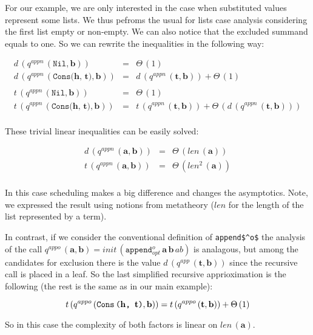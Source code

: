 For our example, we are only interested in the case when substituted values represent some lists. We thus pefroms the usual for lists case analysis
considering the first list empty or non-empty. We can also notice that the excluded summand equals to one. So we can rewrite the inequalities in the following way:

\[
\begin{array}{lcl}
d\,(q^{appn}\,(\texttt{Nil}, \mathbf{b})) & = & \Theta\,(1) \\
d\,(q^{appn}\,(\texttt{Cons($\mathbf{h}$, $\mathbf{t}$)}, \mathbf{b})) & = & d\,(q^{appn}\,(\mathbf{t}, \mathbf{b})) + \Theta\,(1) \\
\\
t\,(q^{appn}\,(\texttt{Nil}, \mathbf{b})) & = & \Theta\,(1) \\
t\,(q^{appn}\,(\texttt{Cons($\mathbf{h}$, $\mathbf{t}$)}, \mathbf{b})) & = & t\,(q^{appn}\,(\mathbf{t}, \mathbf{b})) + \Theta\,(d\,(q^{appn}\,(\mathbf{t}, \mathbf{b}))) \\
\end{array}
 \]
 
These trivial linear inequalities can be easily solved:

\[
\begin{array}{lcl}
d\,(q^{appn}\,(\mathbf{a}, \mathbf{b})) & = & \Theta\,(len\,(\mathbf{a})) \\
t\,(q^{appn}\,(\mathbf{a}, \mathbf{b})) & = & \Theta\,(len^2\,(\mathbf{a})) \\
\end{array}
 \]
 
In this case scheduling makes a big difference and changes the asymptotics. Note, we expressed the result using notions from metatheory
($len$ for the length of the list represented by a term).

In contrast, if we consider the conventional definition of \lstinline|append$^o$| the analysis of the call
$q^{appo}\,(\mathbf{a}, \mathbf{b}) = init\,(\texttt{append$^o_{opt}$} \, \mathbf{a} \, \mathbf{b} \, ab)$ is analagous,
but among the candidates for exclusion there is the value $d\,(q^{app}\,(\mathbf{t}, \mathbf{b}))$ since the recursive
call is placed in a leaf. So the last simplified recursive apprioximation is the following (the rest is
the same as in our main example):

\[t\,(q^{appo}\,(\texttt{Cons\,($\mathbf{h}$, $\mathbf{t}$)}, \mathbf{b})) = t\,(q^{appo}\,(\mathbf{t}, \mathbf{b})) + \Theta\,(1) \]

So in this case the complexity of both factors is linear on $len\,(\mathbf{a})$.
